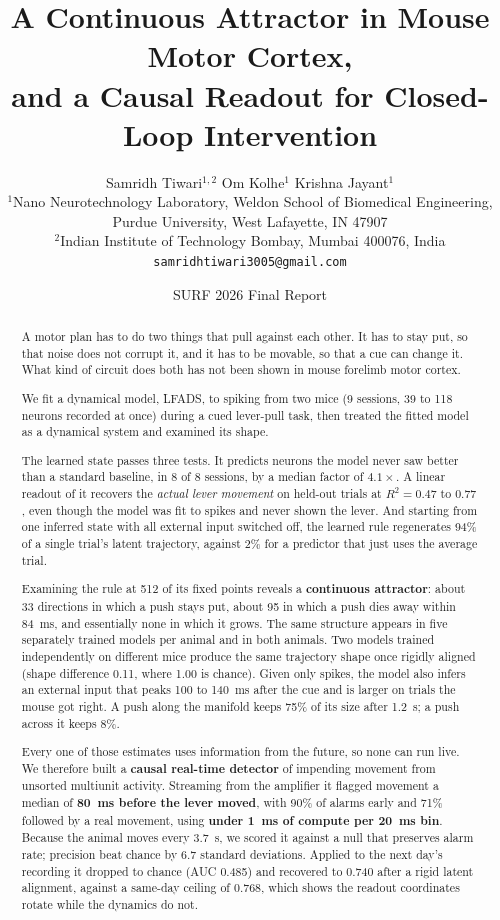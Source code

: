 \documentclass[11pt]{article}
\title{\vspace{-2em}A Continuous Attractor in Mouse Motor Cortex,\\
and a Causal Readout for Closed-Loop Intervention}
\author{
Samridh Tiwari$^{1,2}$ \quad Om Kolhe$^{1}$ \quad Krishna Jayant$^{1}$\\[4pt]
\small $^{1}$Nano Neurotechnology Laboratory, Weldon School of Biomedical
Engineering,\\
\small Purdue University, West Lafayette, IN 47907\\
\small $^{2}$Indian Institute of Technology Bombay, Mumbai 400076, India\\[4pt]
\small \texttt{samridhtiwari3005@gmail.com}}
\date{SURF 2026 Final Report}
\begin{document}
\maketitle

\begin{abstract}\noindent
A motor plan has to do two things that pull against each other. It has to stay
put, so that noise does not corrupt it, and it has to be movable, so that a cue
can change it. What kind of circuit does both has not been shown in mouse
forelimb motor cortex.

We fit a dynamical model, LFADS, to spiking from two mice (9 sessions, 39 to 118
neurons recorded at once) during a cued lever-pull task, then treated the fitted
model as a dynamical system and examined its shape.

The learned state passes three tests. It predicts neurons the model never saw
better than a standard baseline, in 8 of 8 sessions, by a median factor of
$4.1\times$. A linear readout of it recovers the \emph{actual lever movement} on
held-out trials at $R^2 = 0.47$ to $0.77$, even though the model was fit to
spikes and never shown the lever. And starting from one inferred state with all
external input switched off, the learned rule regenerates 94\% of a single
trial's latent trajectory, against 2\% for a predictor that just uses the
average trial.

Examining the rule at 512 of its fixed points reveals a \textbf{continuous
attractor}: about 33 directions in which a push stays put, about 95 in which a
push dies away within 84~ms, and essentially none in which it grows. The same
structure appears in five separately trained models per animal and in both
animals. Two models trained independently on different mice produce the same
trajectory shape once rigidly aligned (shape difference 0.11, where 1.00 is
chance). Given only spikes, the model also infers an external input that peaks
100 to 140~ms after the cue and is larger on trials the mouse got right. A push
along the manifold keeps 75\% of its size after 1.2~s; a push across it keeps
8\%.

Every one of those estimates uses information from the future, so none can run
live. We therefore built a \textbf{causal real-time detector} of impending
movement from unsorted multiunit activity. Streaming from the amplifier it
flagged movement a median of \textbf{80~ms before the lever moved}, with 90\% of
alarms early and 71\% followed by a real movement, using \textbf{under 1~ms of
compute per 20~ms bin}. Because the animal moves every 3.7~s, we scored it
against a null that preserves alarm rate; precision beat chance by 6.7 standard
deviations. Applied to the next day's recording it dropped to chance (AUC 0.485)
and recovered to 0.740 after a rigid latent alignment, against a same-day
ceiling of 0.768, which shows the readout coordinates rotate while the dynamics
do not.


\end{abstract}
\end{document}
